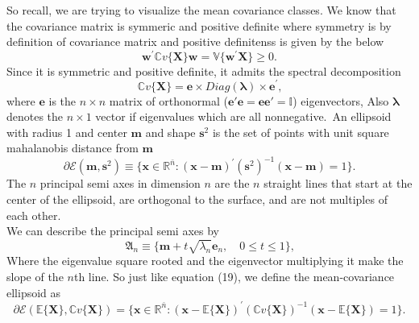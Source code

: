\documentclass[../main.tex]{subfiles}
\begin{document}
\par So recall, we are trying to visualize the mean covariance classes. 
We know that the covariance matrix is symmeric and positive definite 
where symmetry is by definition of covariance matrix and positive definitenss is given by the below
\begin{equation}
    \boldsymbol{w}^{\prime}\mathbb{C}v\{\boldsymbol{X}\}\boldsymbol{w}=\mathbb{V}\{\boldsymbol{w}^{\prime}\boldsymbol{X}\}\geq0\text{.}
    \end{equation}
Since it is symmetric and positive definite, it admits the spectral decomposition
\begin{equation}
    \mathbb{C}v\{\boldsymbol{X}\}=\boldsymbol{e}\times\mathit{Diag}(\boldsymbol{\lambda})\times\boldsymbol{e}^{\prime}\text{,}
    \end{equation}
where $\mathbf{e}$ is the $n \times n$ matrix
of orthonormal ($\mathbf{e'e}=\mathbf{ee'}=\mathbb{I}$) eigenvectors, Also
$\mathbf{\lambda}$ denotes the $n\times 1$ vector if eigenvalues
which are all nonnegative.\
An ellipsoid with radius 1 and center $\mathbf{m}$ and shape $\mathbf{s}^2$
is the set of points with unit square
mahalanobis distance from $\mathbf{m}$
\begin{equation}
    \partial\mathcal{E}(\boldsymbol{m},\boldsymbol{s}^{2})\equiv\{\boldsymbol{x}\in\mathbb{R}^{\bar{n}}:(\boldsymbol{x}-\boldsymbol{m})^{\prime}(\boldsymbol{s}^{2})^{-1}(\boldsymbol{x}-\boldsymbol{m})=1\}\text{.}
    \end{equation}
The $n$ principal semi axes in dimension $n$ are 
the $n$ straight lines that start at the center of the ellipsoid,
are orthogonal to the surface, and are not multiples of each other. \\
We can describe the principal semi axes by 
\begin{equation}
    \mathfrak{A}_{n}\equiv\{\boldsymbol{m}+t\sqrt{\lambda_{n}}\boldsymbol{e}_{n},\quad0\leq t\leq1\}\text{,}
    \end{equation}
Where the eigenvalue square rooted and the eigenvector multiplying it 
make the slope of the $n$th line. 
So just like equation (19), we define the mean-covariance ellipsoid 
as 
\begin{equation}
    \partial\mathcal{E}(\mathbb{E}\{\boldsymbol{X}\},\mathbb{C}v\{\boldsymbol{X}\})=\{\boldsymbol{x}\in\mathbb{R}^{\bar{n}}:(\boldsymbol{x}-\mathbb{E}\{\boldsymbol{X}\})^{\prime}(\mathbb{C}v\{\boldsymbol{X}\})^{-1}(\boldsymbol{x}-\mathbb{E}\{\boldsymbol{X}\})=1\}\text{.}
    \end{equation}
\end{document}
